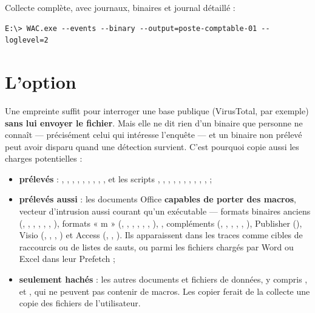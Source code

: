\documentclass[11pt,a4paper,oneside]{report}
\begin{document}
Collecte complète, avec journaux, binaires et journal détaillé :
\begin{lstlisting}
E:\> WAC.exe --events --binary --output=poste-comptable-01 --loglevel=2
\end{lstlisting}

\section{L'option }\label{sec:binary}

Une empreinte suffit pour interroger une base publique (VirusTotal, par exemple)
\textbf{sans lui envoyer le fichier}. Mais elle ne dit rien d'un binaire que
personne ne connaît — précisément celui qui intéresse l'enquête — et un binaire
non prélevé peut avoir disparu quand une détection survient. C'est pourquoi
 copie aussi les charges potentielles :

\begin{itemize}
  \item \textbf{prélevés} : , , ,
        , , , ,
        , ,  et les scripts
        , , , ,
        , , , ,
        , ,  ;
  \item \textbf{prélevés aussi} : les documents Office \textbf{capables de porter
        des macros}, vecteur d'intrusion aussi courant qu'un exécutable —
        formats binaires anciens (, , ,
        , , , ), formats
        « m » (, , , ,
        , , ), ,
        compléments (, , ,
        , , ), Publisher
        (), Visio (, , ,
        ) et Access (, ,
        ). Ils apparaissent dans les traces comme cibles de
        raccourcis ou de listes de sauts, ou parmi les fichiers chargés par
        Word ou Excel dans leur Prefetch ;
  \item \textbf{seulement hachés} : les autres documents et fichiers de données,
        y compris ,  et , qui ne
        peuvent pas contenir de macros. Les copier ferait de la collecte une
        copie des fichiers de l'utilisateur.
\end{itemize}
\end{document}
